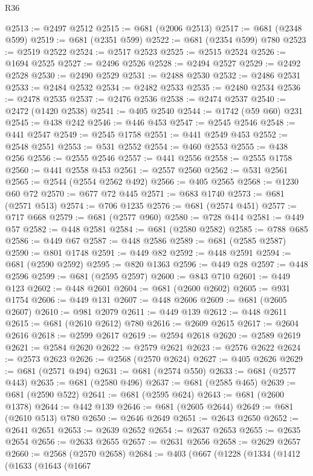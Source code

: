 \begin{lexlean}{R36}
\begin{coremodule}
@2513 := @2497 @2512
@2515 := @681 (@2006 @2513)
@2517 := @681 (@2348 @599)
@2519 := @681 (@2351 @599)
@2522 := @681 (@2354 @599) @780
@2523 := @2519 @2522
@2524 := @2517 @2523
@2525 := @2515 @2524
@2526 := @1694 @2525
@2527 := @2496 @2526
@2528 := @2494 @2527
@2529 := @2492 @2528
@2530 := @2490 @2529
@2531 := @2488 @2530
@2532 := @2486 @2531
@2533 := @2484 @2532
@2534 := @2482 @2533
@2535 := @2480 @2534
@2536 := @2478 @2535
@2537 := @2476 @2536
@2538 := @2474 @2537
@2540 := @2472 (@1420 @2538)
@2541 := @405 @2540
@2544 := @1742 (@59 @60) @231
@2545 := @438 @242
@2546 := @446 @453
@2547 := @2545 @2546
@2548 := @441 @2547
@2549 := @2545 @1758
@2551 := @441 @2549 @453
@2552 := @2548 @2551
@2553 := @531 @2552
@2554 := @460 @2553
@2555 := @438 @256
@2556 := @2555 @2546
@2557 := @441 @2556
@2558 := @2555 @1758
@2560 := @441 @2558 @453
@2561 := @2557 @2560
@2562 := @531 @2561
@2565 := @2544 (@2554 @2562 @492)
@2566 := @405 @2565
@2568 := @1230 @60 @72
@2570 := @677 @72 @445
@2571 := @683 @1740
@2573 := @681 (@2571 @513)
@2574 := @706 @1235
@2576 := @681 (@2574 @451)
@2577 := @717 @668
@2579 := @681 (@2577 @960)
@2580 := @728 @414
@2581 := @449 @57
@2582 := @448 @2581
@2584 := @681 (@2580 @2582)
@2585 := @788 @685
@2586 := @449 @67
@2587 := @448 @2586
@2589 := @681 (@2585 @2587)
@2590 := @801 @1748
@2591 := @449 @82
@2592 := @448 @2591
@2594 := @681 (@2590 @2592)
@2595 := @820 @1363
@2596 := @449 @28
@2597 := @448 @2596
@2599 := @681 (@2595 @2597)
@2600 := @843 @710
@2601 := @449 @123
@2602 := @448 @2601
@2604 := @681 (@2600 @2602)
@2605 := @931 @1754
@2606 := @449 @131
@2607 := @448 @2606
@2609 := @681 (@2605 @2607)
@2610 := @981 @2079
@2611 := @449 @139
@2612 := @448 @2611
@2615 := @681 (@2610 @2612) @780
@2616 := @2609 @2615
@2617 := @2604 @2616
@2618 := @2599 @2617
@2619 := @2594 @2618
@2620 := @2589 @2619
@2621 := @2584 @2620
@2622 := @2579 @2621
@2623 := @2576 @2622
@2624 := @2573 @2623
@2626 := @2568 (@2570 @2624)
@2627 := @405 @2626
@2629 := @681 (@2571 @494)
@2631 := @681 (@2574 @550)
@2633 := @681 (@2577 @443)
@2635 := @681 (@2580 @496)
@2637 := @681 (@2585 @465)
@2639 := @681 (@2590 @522)
@2641 := @681 (@2595 @624)
@2643 := @681 (@2600 @1378)
@2644 := @442 @139
@2646 := @681 (@2605 @2644)
@2649 := @681 (@2610 @513) @780
@2650 := @2646 @2649
@2651 := @2643 @2650
@2652 := @2641 @2651
@2653 := @2639 @2652
@2654 := @2637 @2653
@2655 := @2635 @2654
@2656 := @2633 @2655
@2657 := @2631 @2656
@2658 := @2629 @2657
@2660 := @2568 (@2570 @2658)
@2684 := @403
    (@667
      (@1228
        (@1334
          (@1412
            (@1633
              (@1643
                (@1667

\end{coremodule}
\end{lexlean}

